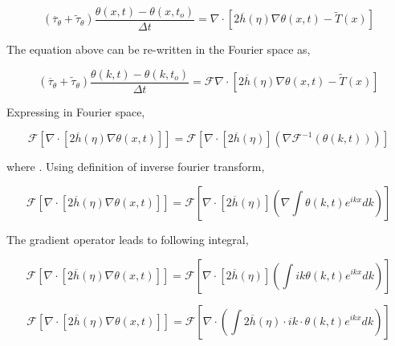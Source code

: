 \documentclass[a4paper,11pt,dvipsnames]{article}
\begin{document}
\begin{equation}
\left ( \overline{\tau}_\theta + \tilde{\tau}_\theta \right ) \frac{\theta (x,t) - \theta (x,t_o)}{\Delta t} = \nabla \cdot \left [ 2 \overline{h}(\eta) \nabla \theta (x,t) - \tilde{T} (x) \right ] \label{eq:3}
\end{equation}

The equation above can be re-written in the Fourier space as,

\begin{equation}
\left ( \overline{\tau}_\theta + \tilde{\tau}_\theta \right ) \frac{\theta (k,t) - \theta (k,t_o)}{\Delta t} = \mathcal{F} \nabla \cdot \left [ 2 \overline{h}(\eta) \nabla \theta (x,t) - \tilde{T} (x) \right ] \label{eq:4}
\end{equation}

Expressing  in Fourier space,  

\begin{equation}
\mathcal{F} \left [ \nabla \cdot \left [ 2 \overline{h}(\eta) \nabla \theta (x,t) \right ] \right ] = 
\mathcal{F} \left [ \nabla \cdot \left [ 2 \overline{h}(\eta) \right ] \left ( \nabla \mathcal{F}^{-1} \left (\theta (k,t) \right ) \right ) \right ] \label{eq:5}
\end{equation}

where . 
Using definition of inverse fourier transform, 

\begin{equation}
\mathcal{F} \left [ \nabla \cdot \left [ 2 \overline{h}(\eta) \nabla \theta (x,t) \right ] \right ] = 
\mathcal{F} \left [ \nabla \cdot \left [ 2 \overline{h}(\eta) \right ] \left ( \nabla \int \theta (k,t) e^{ikx} dk \right ) \right ] \label{eq:6}
\end{equation}

The gradient operator leads to following integral, 

\begin{equation}
\mathcal{F} \left [ \nabla \cdot \left [ 2 \overline{h}(\eta) \nabla \theta (x,t) \right ] \right ] = 
\mathcal{F} \left [ \nabla \cdot \left [ 2 \overline{h}(\eta) \right ] \left ( \int ik \theta (k,t) e^{ikx} dk \right ) \right ] \label{eq:7}
\end{equation}

\begin{equation}
\mathcal{F} \left [ \nabla \cdot \left [ 2 \overline{h}(\eta) \nabla \theta (x,t) \right ] \right ] = 
\mathcal{F} \left [ \nabla \cdot \left ( \int 2 \overline{h} (\eta) \cdot ik \cdot \theta (k,t) e^{ikx} dk \right ) \right ] \label{eq:8}
\end{equation}
\end{document}
